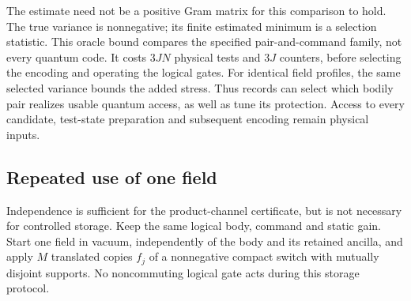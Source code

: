 \documentclass[11pt]{article}
\theoremstyle{definition}
\theoremstyle{remark}
\begin{document}
The estimate need not be a positive Gram matrix for this comparison
to hold. The true variance is nonnegative; its finite estimated
minimum is a selection statistic. This oracle bound compares the
specified pair-and-command family, not every quantum code.
It costs $3JN$ physical tests and $3J$ counters, before selecting
the encoding and operating the logical gates. For identical field
profiles, the same selected variance bounds the added stress.
Thus records can select which bodily pair realizes usable quantum
access, as well as tune its protection. Access to every candidate,
test-state preparation and subsequent encoding remain physical inputs.

\subsection{Repeated use of one field}
\label{subsec:one_field}

Independence is sufficient for the product-channel certificate, but
is not necessary for controlled storage. Keep the same logical body,
command and static gain. Start one field in vacuum, independently
of the body and its retained ancilla, and apply $M$ translated copies
$f_j$ of a nonnegative compact switch with mutually disjoint supports.
No noncommuting logical gate acts during this storage protocol.
\end{document}
